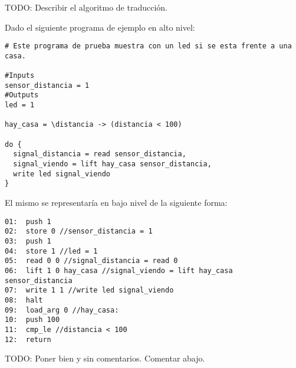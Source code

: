 
TODO: Describir el algoritmo de traducción.

Dado el siguiente programa de ejemplo en alto nivel:

\begin{verbatim}
# Este programa de prueba muestra con un led si se esta frente a una casa.

#Inputs
sensor_distancia = 1
#Outputs
led = 1

hay_casa = \distancia -> (distancia < 100)

do {
  signal_distancia = read sensor_distancia,
  signal_viendo = lift hay_casa sensor_distancia,
  write led signal_viendo
}
\end{verbatim}

El mismo se representaría en bajo nivel de la siguiente forma:

\begin{verbatim}
01:  push 1
02:  store 0 //sensor_distancia = 1
03:  push 1
04:  store 1 //led = 1
05:  read 0 0 //signal_distancia = read 0
06:  lift 1 0 hay_casa //signal_viendo = lift hay_casa sensor_distancia
07:  write 1 1 //write led signal_viendo
08:  halt
09:  load_arg 0 //hay_casa:
10:  push 100
11:  cmp_le //distancia < 100
12:  return
\end{verbatim}

TODO: Poner bien y sin comentarios. Comentar abajo.

